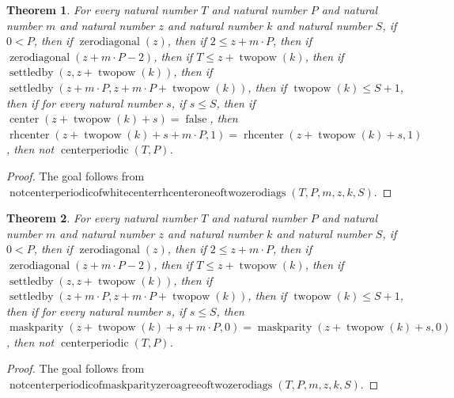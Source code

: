 \documentclass[11pt]{article}
\newtheorem{theorem}{Theorem}[section]
\theoremstyle{definition}
\begin{document}
\begin{theorem}
\label{ll:paper:not-centerperiodic-of-white-center-rhcenter-one-of-two-zero-diags}
For every natural number \(T\) and natural number \(P\) and natural number \(m\) and natural number \(z\) and natural number \(k\) and natural number \(S\), if \(0 < P\), then if \(\operatorname{zerodiagonal}(z)\), then if \(2 \le z + m \cdot P\), then if \(\operatorname{zerodiagonal}(z + m \cdot P - 2)\), then if \(T \le z + \operatorname{twopow}(k)\), then if \(\operatorname{settledby}(z, z + \operatorname{twopow}(k))\), then if \(\operatorname{settledby}(z + m \cdot P, z + m \cdot P + \operatorname{twopow}(k))\), then if \(\operatorname{twopow}(k) \le S + 1\), then if for every natural number \(s\), if \(s \le S\), then if \(\operatorname{center}(z + \operatorname{twopow}(k) + s) = \operatorname{false}\), then \(\operatorname{rhcenter}(z + \operatorname{twopow}(k) + s + m \cdot P, 1) = \operatorname{rhcenter}(z + \operatorname{twopow}(k) + s, 1)\), then not \(\operatorname{centerperiodic}(T, P)\).
\end{theorem}
\begin{proof}
The goal follows from \(\operatorname{notcenterperiodicofwhitecenterrhcenteroneoftwozerodiags}(T, P, m, z, k, S)\).
\end{proof}
\begin{theorem}
\label{ll:paper:not-centerperiodic-of-maskparity-zero-agree-of-two-zero-diags}
For every natural number \(T\) and natural number \(P\) and natural number \(m\) and natural number \(z\) and natural number \(k\) and natural number \(S\), if \(0 < P\), then if \(\operatorname{zerodiagonal}(z)\), then if \(2 \le z + m \cdot P\), then if \(\operatorname{zerodiagonal}(z + m \cdot P - 2)\), then if \(T \le z + \operatorname{twopow}(k)\), then if \(\operatorname{settledby}(z, z + \operatorname{twopow}(k))\), then if \(\operatorname{settledby}(z + m \cdot P, z + m \cdot P + \operatorname{twopow}(k))\), then if \(\operatorname{twopow}(k) \le S + 1\), then if for every natural number \(s\), if \(s \le S\), then \(\operatorname{maskparity}(z + \operatorname{twopow}(k) + s + m \cdot P, 0) = \operatorname{maskparity}(z + \operatorname{twopow}(k) + s, 0)\), then not \(\operatorname{centerperiodic}(T, P)\).
\end{theorem}
\begin{proof}
The goal follows from \(\operatorname{notcenterperiodicofmaskparityzeroagreeoftwozerodiags}(T, P, m, z, k, S)\).
\end{proof}
\end{document}
